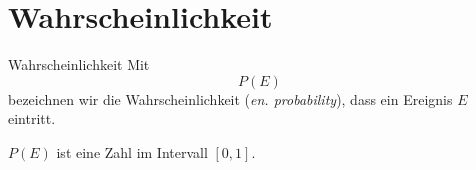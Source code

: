 
\section{Wahrscheinlichkeit}
\begin{definition}{Wahrscheinlichkeit}{}
Mit $$P(E)$$ bezeichnen wir die Wahrscheinlichkeit (\textit{en. probability}), dass ein Ereignis $E$ eintritt.

$P(E)$ ist eine Zahl im Intervall $[0,1]$.
\end{definition}

\newpage






